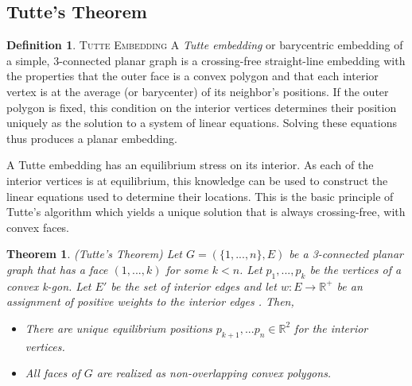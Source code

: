 \documentclass[11pt]{article}
\newcommand{\R}{\mathbb{R}}
\newtheorem{theorem}{Theorem}[section]
\theoremstyle{definition}
\newtheorem{definition}{Definition}[section]
\begin{document}
\subsection{Tutte's Theorem}
	\theoremstyle{definition}
	\begin{definition}{\textsc{Tutte Embedding}}
		A \emph{Tutte embedding} or barycentric embedding of a simple, 3-connected planar graph is a crossing-free straight-line embedding with the properties that the outer face is a convex polygon and that each interior vertex is at the average (or barycenter) of its neighbor's positions. 
		If the outer polygon is fixed, this condition on the interior vertices determines their position uniquely as the solution to a system of linear equations. 
		Solving these equations thus produces a planar embedding. 
  	\end{definition}
	
	A Tutte embedding has an equilibrium stress on its interior. As each of the interior vertices is at equilibrium, this knowledge can be used to construct the linear equations used to determine their locations.
	This is the basic principle of Tutte's algorithm which yields a unique solution that is always crossing-free, with convex faces.
 	
 	\begin{theorem}{(Tutte's Theorem)}
 		Let $G = (\{1,...,n\},E)$ be a 3-connected planar graph that has a face $(1,...,k)$ for some $k<n$. Let $p_1,...,p_k$ be the vertices of a convex k-gon. 
		Let $E'$ be the set of interior edges and let $w : E \rightarrow \R^+$ be an assignment of positive weights to the interior edges \cite{realizationSpaces}. Then,
 		\begin{itemize}
			\item There are unique equilibrium positions $p_{k+1}, ...p_n \in \R^2$ for the interior vertices. 
			\item All faces of $G$ are realized as non-overlapping convex polygons.
		\end{itemize}
	\end{theorem}
\end{document}
